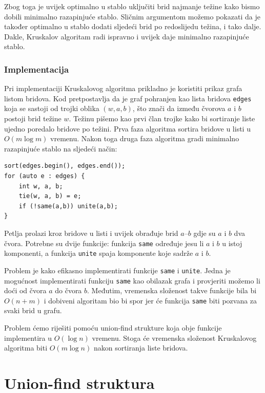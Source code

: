 Zbog toga je uvijek optimalno
u stablo uključiti brid najmanje težine
kako bismo dobili minimalno razapinjuće stablo.
Sličnim argumentom možemo pokazati da je
također optimalno u stablo dodati sljedeći brid
po redoslijedu težina, i tako dalje.
Dakle, Kruskalov algoritam radi ispravno i
uvijek daje minimalno razapinjuće stablo.

\subsubsection{Implementacija}

Pri implementaciji Kruskalovog algoritma
prikladno je koristiti
prikaz grafa listom bridova.
Kod pretpostavlja da je graf pohranjen
kao lista bridova \texttt{edges}
koja se sastoji od trojki oblika $(w,a,b)$,
što znači da između čvorova $a$ i $b$
postoji brid težine $w$.
Težinu pišemo kao prvi član trojke
kako bi sortiranje liste ujedno poredalo
bridove po težini.
Prva faza algoritma sortira
bridove u listi u $O(m \log m)$ vremenu.
Nakon toga druga faza algoritma
gradi minimalno razapinjuće stablo na sljedeći način:

\begin{lstlisting}
sort(edges.begin(), edges.end());
for (auto e : edges) {
    int w, a, b;
    tie(w, a, b) = e;
    if (!same(a,b)) unite(a,b);
}
\end{lstlisting}

Petlja prolazi kroz bridove u listi
i uvijek obrađuje brid $a$--$b$
gdje su $a$ i $b$ dva čvora.
Potrebne su dvije funkcije:
funkcija \texttt{same} određuje
jesu li $a$ i $b$ u istoj komponenti,
a funkcija \texttt{unite}
spaja komponente koje sadrže $a$ i $b$.

Problem je kako efikasno implementirati
funkcije \texttt{same} i \texttt{unite}.
Jedna je mogućnost implementirati funkciju
\texttt{same} kao obilazak grafa i provjeriti možemo li
doći od čvora $a$ do čvora $b$.
Međutim, vremenska složenost takve funkcije
bila bi $O(n+m)$
i dobiveni algoritam bio bi spor
jer će funkcija \texttt{same} biti pozvana za svaki brid u grafu.

Problem ćemo riješiti pomoću union-find strukture
koja obje funkcije implementira u $O(\log n)$ vremenu.
Stoga će vremenska složenost Kruskalovog algoritma
biti $O(m \log n)$ nakon sortiranja liste bridova.

\section{Union-find struktura}

